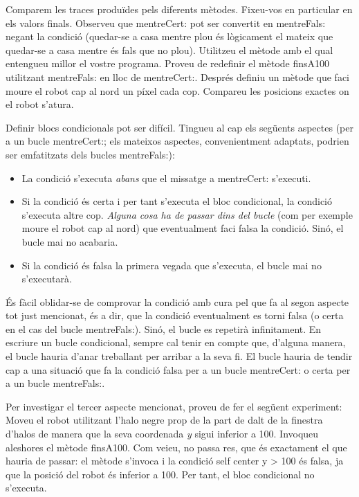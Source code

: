 Comparem les traces produïdes pels diferents mètodes. Fixeu-vos en particular en els valors finals. Observeu que \textsf{mentreCert:} pot ser convertit en \textsf{mentreFals:} negant la condició (quedar-se a casa mentre plou és lògicament el mateix que quedar-se a casa mentre és fals que no plou). Utilitzeu el mètode amb el qual entengueu millor el vostre programa. Proveu de redefinir el mètode \textsf{finsA100} utilitzant \textsf{mentreFals:}  en lloc de \textsf{mentreCert:}. Després definiu un mètode que faci moure el robot cap al nord un píxel cada cop. Compareu les posicions exactes on el robot s'atura.  

Definir blocs condicionals pot ser difícil. Tingueu al cap els següents aspectes (per a un bucle \textsf{mentreCert:}; els mateixos aspectes, convenientment adaptats, podrien ser emfatitzats dels bucles \textsf{mentreFals:}): 
\begin{itemize}
\item La condició s'executa \emph{abans} que el missatge a \textsf{mentreCert:} s'executi.
\item Si la condició és certa i per tant s'executa el bloc condicional, la condició s'executa altre cop. \emph{Alguna cosa ha de passar dins del bucle} (com per exemple moure el robot cap al nord) que eventualment faci falsa la condició. Sinó, el bucle mai no acabaria. 
\item Si la condició és falsa la primera vegada que s'executa, el bucle mai no s'executarà.
\end{itemize}

És fàcil oblidar-se de comprovar la condició amb cura pel que fa al segon aspecte tot just mencionat, és a dir, que la condició eventualment es torni falsa (o certa en el cas del bucle \textsf{mentreFals:}). Sinó, el bucle es repetirà infinitament. En escriure un bucle condicional, sempre cal tenir en compte que, d'alguna manera, el bucle hauria d'anar treballant per arribar a la seva fi. El bucle hauria de tendir cap a una situació que fa la condició falsa per a un bucle \textsf{mentreCert:} o certa per a un bucle \textsf{mentreFals:}.

Per investigar el tercer aspecte mencionat, proveu de fer el següent experiment: Moveu el robot utilitzant l'halo negre prop de la part de dalt de la finestra d'halos de manera que la seva coordenada \emph{y} sigui inferior a 100. Invoqueu aleshores el mètode \textsf{finsA100}. Com veieu, no passa res, que és exactament el que hauria de passar: el mètode s'invoca i la condició \textsf{self center y \textgreater \hspace*{1mm} 100} és falsa, ja que la posició del robot és inferior a 100. Per tant, el bloc condicional no s'executa.  


